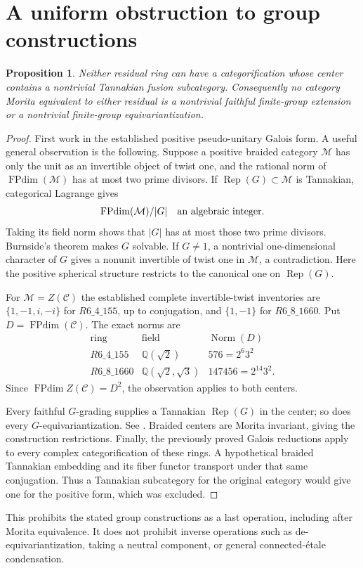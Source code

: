 \documentclass[10pt]{article}
\newtheorem{proposition}[theorem]{Proposition}
\newcommand{\FPdim}{\operatorname{FPdim}}
\newcommand{\C}{\mathcal C}
\newcommand{\M}{\mathcal M}
\begin{document}
\section{A uniform obstruction to group constructions}
\begin{proposition}\label{prop:no-tannakian}
Neither residual ring can have a categorification whose center contains a nontrivial Tannakian fusion subcategory. Consequently no category Morita equivalent to either residual is a nontrivial faithful finite-group extension or a nontrivial finite-group equivariantization.
\end{proposition}
\begin{proof}
First work in the established positive pseudo-unitary Galois form. A useful general observation is the following. Suppose a positive braided category $\M$ has only the unit as an invertible object of twist one, and the rational norm of $\FPdim(\M)$ has at most two prime divisors. If $\operatorname{Rep}(G)\subset\M$ is Tannakian, categorical Lagrange gives
\[
 \FPdim(\M)/|G|\quad\hbox{an algebraic integer}.
\]
Taking its field norm shows that $|G|$ has at most those two prime divisors. Burnside's theorem makes $G$ solvable. If $G\ne1$, a nontrivial one-dimensional character of $G$ gives a nonunit invertible of twist one in $\M$, a contradiction. Here the positive spherical structure restricts to the canonical one on $\operatorname{Rep}(G)$.

For $\M=Z(\C)$ the established complete invertible-twist inventories are $\{1,-1,i,-i\}$ for $R6\_4\_155$, up to conjugation, and $\{1,-1\}$ for $R6\_8\_1660$. Put $D=\FPdim(\C)$. The exact norms are
\[
 \begin{array}{c|c|c}
 \text{ring}&\text{field}&\operatorname{Norm}(D)\\\hline
 R6\_4\_155&\mathbb Q(\sqrt2)&576=2^6 3^2\\
 R6\_8\_1660&\mathbb Q(\sqrt2,\sqrt3)&147456=2^{14}3^2.
 \end{array}
\]
Since $\FPdim Z(\C)=D^2$, the observation applies to both centers.

Every faithful $G$-grading supplies a Tannakian $\operatorname{Rep}(G)$ in the center; so does every $G$-equivariantization. See \cite[Propositions 8.23.1 and 8.23.11]{EGNO}. Braided centers are Morita invariant, giving the construction restrictions. Finally, the previously proved Galois reductions apply to every complex categorification of these rings. A hypothetical braided Tannakian embedding and its fiber functor transport under that same conjugation. Thus a Tannakian subcategory for the original category would give one for the positive form, which was excluded.
\end{proof}
This prohibits the stated group constructions as a last operation, including after Morita equivalence. It does not prohibit inverse operations such as de-equivariantization, taking a neutral component, or general connected-\'etale condensation.
\end{document}
